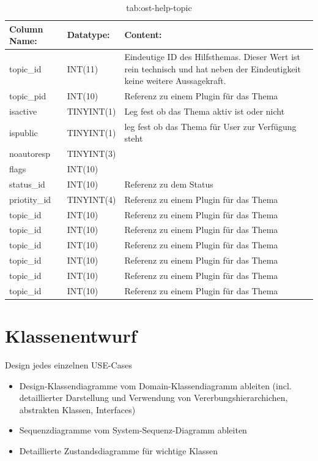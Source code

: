 \begin{table}[h]
	\begin{tabular}{|p{3cm}|p{4cm}|p{7.7cm}|}
		\hline
		\textbf{Column Name:} & \textbf{Datatype:} & \textbf{Content:}\\
		\hline
		topic\_id & INT(11) & Eindeutige ID des Hilfsthemas. Dieser Wert ist rein technisch und hat  neben der Eindeutigkeit keine weitere Aussagekraft.\\
		\hline
		topic\_pid & INT(10) & Referenz zu einem Plugin für das Thema\\
		\hline
		isactive & TINYINT(1) & Leg fest ob das Thema aktiv ist oder nicht \\
		\hline
		ispublic & TINYINT(1) & leg fest ob das Thema für User zur Verfügung steht\\
		\hline
		noautoresp & TINYINT(3) & \\
		\hline
		flags & INT(10) & \\
		\hline
		status\_id & INT(10) & Referenz zu dem Status \\
		\hline
		priotity\_id & TINYINT(4) & Referenz zu einem Plugin für das Thema\\
		\hline
		topic\_id & INT(10) & Referenz zu einem Plugin für das Thema\\
		\hline
		topic\_id & INT(10) & Referenz zu einem Plugin für das Thema\\
		\hline
		topic\_id & INT(10) & Referenz zu einem Plugin für das Thema\\
		\hline
		topic\_id & INT(10) & Referenz zu einem Plugin für das Thema\\
		\hline
		topic\_id & INT(10) & Referenz zu einem Plugin für das Thema\\
		\hline
		topic\_id & INT(10) & Referenz zu einem Plugin für das Thema\\
		\hline
		
	\end{tabular}
	\caption{tab:ost-help-topic}
\end{table}
\label{tab:ost_help_topic}

\section{Klassenentwurf}
Design jedes einzelnen USE-Cases

\begin{itemize}
	\item Design-Klassendiagramme vom Domain-Klassendiagramm ableiten (incl. detaillierter Darstellung und Verwendung von Vererbungshierarchichen, abstrakten Klassen, Interfaces)
	\item Sequenzdiagramme vom System-Sequenz-Diagramm ableiten
	\item 	Detaillierte Zustandsdiagramme für wichtige Klassen
\end{itemize}

